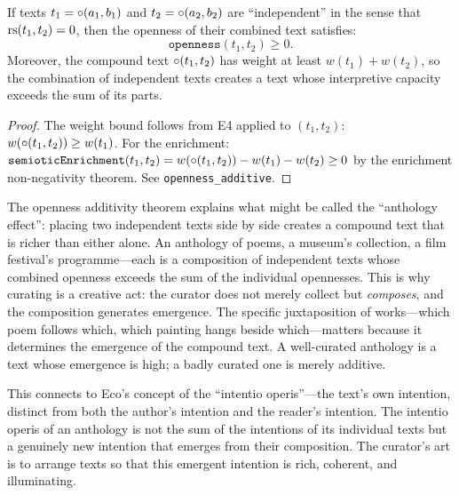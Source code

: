 \begin{theorem}
\label{thm:openness-additive}
If texts $t_1 = \circ(a_1, b_1)$ and $t_2 = \circ(a_2, b_2)$ are ``independent'' in the sense that $\mathrm{rs}(t_1, t_2) = 0$, then the openness of their combined text satisfies:
\[
  \texttt{openness}(t_1, t_2) \geq 0.
\]
Moreover, the compound text $\circ(t_1, t_2)$ has weight at least $w(t_1) + w(t_2)$, so the combination of independent texts creates a text whose interpretive capacity exceeds the sum of its parts.
\end{theorem}

\begin{proof}
The weight bound follows from E4 applied to $(t_1, t_2)$: $w(\circ(t_1, t_2)) \geq w(t_1)$. For the enrichment: $\texttt{semioticEnrichment}(t_1, t_2) = w(\circ(t_1, t_2)) - w(t_1) - w(t_2) \geq 0$ by the enrichment non-negativity theorem. See \texttt{openness\_additive}.
\end{proof}

\begin{interpretation}
The openness additivity theorem explains what might be called the ``anthology effect'': placing two independent texts side by side creates a compound text that is richer than either alone. An anthology of poems, a museum's collection, a film festival's programme---each is a composition of independent texts whose combined openness exceeds the sum of the individual opennesses. This is why curating is a creative act: the curator does not merely collect but \emph{composes}, and the composition generates emergence. The specific juxtaposition of works---which poem follows which, which painting hangs beside which---matters because it determines the emergence of the compound text. A well-curated anthology is a text whose emergence is high; a badly curated one is merely additive.

This connects to Eco's concept of the ``intentio operis''---the text's own intention, distinct from both the author's intention and the reader's intention. The intentio operis of an anthology is not the sum of the intentions of its individual texts but a genuinely new intention that emerges from their composition. The curator's art is to arrange texts so that this emergent intention is rich, coherent, and illuminating.
\end{interpretation}

